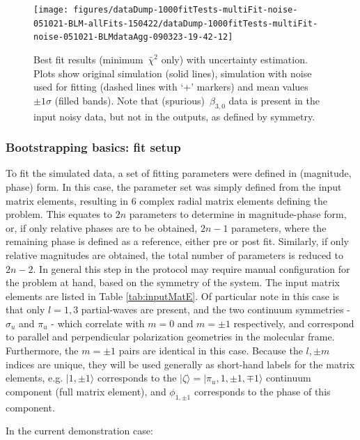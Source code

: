 \documentclass[10pt]{article}
\begin{document}
\begin{figure}[H]
\begin{center}
\texttt{[image: figures/dataDump-1000fitTests-multiFit-noise-051021-BLM-allFits-150422/dataDump-1000fitTests-multiFit-noise-051021-BLMdataAgg-090323-19-42-12]}
\caption{{Best fit results (minimum~\(\bar{\chi}^2\) only) with uncertainty
estimation. Plots show original simulation (solid lines), simulation
with noise used for fitting (dashed lines with `+' markers) and mean
values~\(\pm1\sigma\) (filled bands). Note that
(spurious)~\(\beta_{3,0}\) data is present in the input noisy data,
but not in the outputs, as defined by symmetry.
{\label{743962}}%
}}
\end{center}
\end{figure}

\subsubsection{Bootstrapping basics: fit setup}

To fit the simulated data, a set of fitting parameters were defined in (magnitude, phase) form. In this case, the parameter set was simply defined from the input matrix elements, resulting in 6 complex radial matrix elements defining the problem. This equates to $2n$ parameters to determine in magnitude-phase form, or, if only relative phases are to be obtained, $2n-1$ parameters, where the remaining phase is defined as a reference, either pre or post fit. Similarly, if only relative magnitudes are obtained, the total number of parameters is reduced to $2n-2$. In general this step in the protocol may require manual configuration for the problem at hand, based on the symmetry of the system. The input matrix elements are listed in Table \ref{tab:inputMatE}. Of particular note in this case is that only $l=1,3$ partial-waves are present, and the two continuum symmetries - $\sigma_u$ and $\pi_u$ - which correlate with $m=0$ and $m=\pm1$ respectively, and correspond to parallel and perpendicular polarization geometries in the molecular frame. Furthermore, the $m=\pm1$ pairs are identical in this case. Because the $l,\pm m$ indices are unique, they will be used generally as short-hand labels for the matrix elements, e.g. $|1,\pm1\rangle$ corresponds to the $|\zeta\rangle = |\pi_u,1,\pm 1,\mp 1 \rangle$ continuum component (full matrix element), and $\phi_{1,\pm1}$ corresponds to the phase of this component.

In the current demonstration case:
\end{document}
